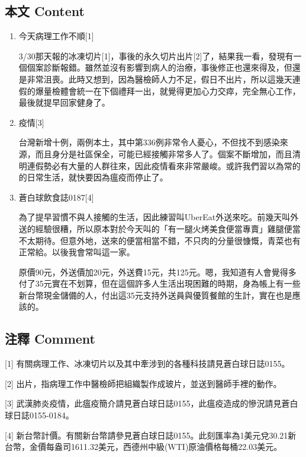 \documentclass[
]{article}
\begin{document}
\hypertarget{ux672cux6587-content-1}{%
\subsection{本文 Content}\label{ux672cux6587-content-1}}

\begin{enumerate}
\def\labelenumi{\arabic{enumi}.}
\item
  今天病理工作不順{[}1{]}

  3/30那天報的冰凍切片{[}1{]}，事後的永久切片出片{[}2{]}了，結果我一看，發現有一個個案診斷報錯。雖然並沒有影響到病人的治療，事後修正也還來得及，但還是非常沮喪。此時又想到，因為醫檢師人力不足，假日不出片，所以這幾天連假的爆量檢體會統一在下個禮拜一出，就覺得更加心力交瘁，完全無心工作，最後就提早回家健身了。
\item
  疫情{[}3{]}

  台灣新增十例，兩例本土，其中第336例非常令人憂心，不但找不到感染來源，而且身分是社區保全，可能已經接觸非常多人了。個案不斷增加，而且清明連假勢必有大量的人群往來，因此疫情看來非常嚴峻。或許我們習以為常的的日常生活，就快要因為瘟疫而停止了。
\item
  蒼白球飲食誌0187{[}4{]}

  為了提早習慣不與人接觸的生活，因此練習叫UberEat外送來吃。前幾天叫外送的經驗很糟，所以原本對於今天叫的「有一腿火烤美食便當專賣」雞腿便當不太期待。但意外地，送來的便當相當不錯，不只肉的分量很慷慨，青菜也有正常給。以後我會常叫這一家。

  原價90元，外送價加20元，外送費15元，共125元。嗯，我知道有人會覺得多付了35元實在不划算，但在這個許多人生活出現困難的時期，身為帳上有一些新台幣現金儲備的人，付出這35元支持外送員與優質餐館的生計，實在也是應該的。
\end{enumerate}

\hypertarget{ux6ce8ux91cb-comment-1}{%
\subsection{注釋 Comment}\label{ux6ce8ux91cb-comment-1}}

{[}1{]}
有關病理工作、冰凍切片以及其中牽涉到的各種科技請見蒼白球日誌0155。

{[}2{]} 出片，指病理工作中醫檢師把組織製作成玻片，並送到醫師手裡的動作。

{[}3{]}
武漢肺炎疫情，此瘟疫簡介請見蒼白球日誌0155，此瘟疫造成的慘況請見蒼白球日誌0155-0184。

{[}4{]}
新台幣計價。有關新台幣請參見蒼白球日誌0155。此刻匯率為1美元兌30.21新台幣，金價每盎司1611.32美元，西德州中級(WTI)原油價格每桶22.03美元。
\end{document}
